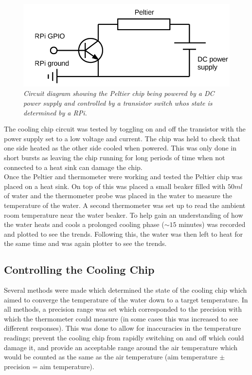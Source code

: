 \documentclass[10pt]{article}
\begin{document}
\begin{figure}[h!]
    \centering
    \includegraphics[scale=0.5]{circuit.png}
    \caption{\it{Circuit diagram showing the Peltier chip being powered by a DC power supply and controlled by a transistor switch whos state is determined by a RPi\cite{course_notes}.}}
    \label{fig:circuit}
\end{figure}

The cooling chip circuit was tested by toggling on and off the transistor with the power supply set to a low voltage and current. The chip was held to check that one side heated as the other side cooled when powered. This was only done in short bursts as leaving the chip running for long periods of time when not connected to a heat sink can damage the chip. \\

Once the Peltier and thermometer were working and tested the Peltier chip was placed on a heat sink. On top of this was placed a small beaker filled with $50ml$ of water and the thermometer probe was placed in the water to measure the temperature of the water. A second thermometer was set up to read the ambient room temperature near the water beaker. To help gain an understanding of how the water heats and cools a prolonged cooling phase ($\sim15$ minutes) was recorded and plotted to see the trends. Following this, the water was then left to heat for the same time and was again plotter to see the trends.



\subsection*{Controlling the Cooling Chip}
Several methods were made which determined the state of the cooling chip which aimed to converge the temperature of the water down to a target temperature. In all methods, a precision range was set which corresponded to the precision with which the thermometer could measure (in some cases this was increased to see different responses). This was done to allow for inaccuracies in the temperature readings; prevent the cooling chip from rapidly switching on and off which could damage it, and provide an acceptable range around the air temperature which would be counted as the same as the air temperature (aim temperature $\pm$ precision = aim temperature).\\
\end{document}
